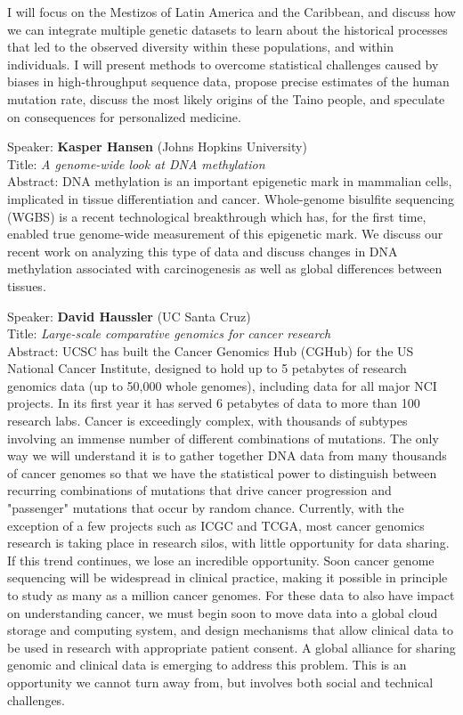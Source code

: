 \documentclass[11pt]{article}
\begin{document}
\noindent I will focus on the Mestizos of Latin America and the Caribbean, and
discuss how we can integrate multiple genetic datasets to learn about
the historical processes that led to the observed diversity within
these populations, and within individuals. I will present methods to
overcome statistical challenges caused by biases in high-throughput
sequence data, propose precise estimates of the human mutation rate,
discuss the most likely origins of the Taino people, and speculate on
consequences for personalized medicine.

\bigskip
\noindent
Speaker: {\bf Kasper Hansen} (Johns Hopkins University)\\
Title: {\it A genome-wide look at DNA methylation}\\
Abstract: DNA methylation is an important epigenetic mark in mammalian
cells, implicated in tissue differentiation and cancer.  Whole-genome
bisulfite sequencing (WGBS) is a recent technological breakthrough
which has, for the first time, enabled true genome-wide measurement of
this epigenetic mark. We discuss our recent work on analyzing this
type of data and discuss changes in DNA methylation associated with
carcinogenesis as well as global differences between tissues.

\bigskip
\noindent
Speaker: {\bf David Haussler} (UC Santa Cruz)\\
Title: {\it Large-scale comparative genomics for cancer research}\\
Abstract: UCSC has built the Cancer Genomics Hub (CGHub) for the US
National Cancer Institute, designed to hold up to 5 petabytes of
research genomics data (up to 50,000 whole genomes), including data
for all major NCI projects. In its first year it has served 6
petabytes of data to more than 100 research labs.  Cancer is
exceedingly complex, with thousands of subtypes involving an immense
number of different combinations of mutations. The only way we will
understand it is to gather together DNA data from many thousands of
cancer genomes so that we have the statistical power to distinguish
between recurring combinations of mutations that drive cancer
progression and "passenger" mutations that occur by random
chance. Currently, with the exception of a few projects such as ICGC
and TCGA, most cancer genomics research is taking place in research
silos, with little opportunity for data sharing. If this trend
continues, we lose an incredible opportunity.  Soon cancer genome
sequencing will be widespread in clinical practice, making it possible
in principle to study as many as a million cancer genomes.  For these
data to also have impact on understanding cancer, we must begin soon
to move data into a global cloud storage and computing system, and
design mechanisms that allow clinical data to be used in research with
appropriate patient consent. A global alliance for sharing genomic and
clinical data is emerging to address this problem. This is an
opportunity we cannot turn away from, but involves both social and
technical challenges.\\
\end{document}
